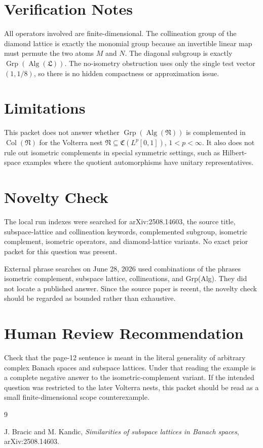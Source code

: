 \documentclass[11pt]{article}
\newcommand{\Alg}{\operatorname{Alg}}
\newcommand{\Col}{\operatorname{Col}}
\newcommand{\Grp}{\operatorname{Grp}}
\begin{document}
\section*{Verification Notes}

All operators involved are finite-dimensional. The collineation group of the
diamond lattice is exactly the monomial group because an invertible linear map
must permute the two atoms \(M\) and \(N\). The diagonal subgroup is exactly
\(\Grp(\Alg(\mathfrak L))\). The no-isometry obstruction uses only the single
test vector \((1,1/8)\), so there is no hidden compactness or approximation
issue.

\section*{Limitations}

This packet does not answer whether \(\Grp(\Alg(\mathfrak N))\) is
complemented in \(\Col(\mathfrak N)\) for the Volterra nest
\(\mathfrak N\subseteq \mathfrak C(L^p[0,1])\), \(1<p<\infty\). It also does
not rule out isometric complements in special symmetric settings, such as
Hilbert-space examples where the quotient automorphisms have unitary
representatives.

\section*{Novelty Check}

The local run indexes were searched for arXiv:2508.14603, the source title,
subspace-lattice and collineation keywords, complemented subgroup, isometric
complement, isometric operators, and diamond-lattice variants. No exact prior
packet for this question was present.

External phrase searches on June 28, 2026 used combinations of the phrases
isometric complement, subspace lattice, collineations, and Grp(Alg). They did
not locate a published answer. Since the source paper is recent, the novelty
check should be regarded as bounded rather than exhaustive.

\section*{Human Review Recommendation}

Check that the page-12 sentence is meant in the literal generality of arbitrary
complex Banach spaces and subspace lattices. Under that reading the example is
a complete negative answer to the isometric-complement variant. If the intended
question was restricted to the later Volterra nests, this packet should be
read as a small finite-dimensional scope counterexample.

\begin{thebibliography}{9}

J. Bracic and M. Kandic,
\emph{Similarities of subspace lattices in Banach spaces},
arXiv:2508.14603.

\end{thebibliography}
\end{document}
